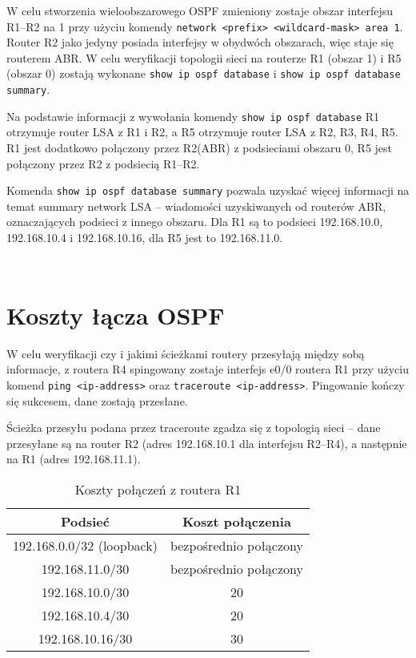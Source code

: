 \documentclass[a4paper,12pt,notitlepage]{article}
\begin{document}
W celu stworzenia wieloobszarowego OSPF zmieniony zostaje obszar interfejsu R1--R2 na 1 przy użyciu komendy \texttt{network <prefix> <wildcard-mask> area 1}. Router R2 jako jedyny posiada interfejsy w obydwóch obszarach, więc staje się routerem ABR. W celu weryfikacji topologii sieci na routerze R1 (obszar 1) i R5 (obszar 0) zostają wykonane \texttt{show ip ospf database} i \texttt{show ip ospf database summary}.

Na podstawie informacji z wywołania komendy \texttt{show ip ospf database} R1 otrzymuje router LSA z R1 i R2, a R5 otrzymuje router LSA z R2, R3, R4, R5. R1 jest dodatkowo połączony przez R2(ABR) z podsieciami obszaru 0, R5 jest połączony przez R2 z podsiecią R1--R2.

Komenda \texttt{show ip ospf database summary} pozwala uzyskać więcej informacji na temat summary network LSA -- wiadomości uzyskiwanych od routerów ABR, oznaczających podsieci z innego obszaru. Dla R1 są to podsieci 192.168.10.0, 192.168.10.4 i 192.168.10.16, dla R5 jest to 192.168.11.0.
\inputminted[label=Router R1, firstline=309, lastline=390]{text}{R1.txt}
\inputminted[label=Router R5, firstline=638, lastline=680]{text}{R5.txt}

\section{Koszty łącza OSPF}

W celu weryfikacji czy i jakimi ścieżkami routery przesyłają między sobą informacje, z routera R4 spingowany zostaje interfejs e0/0 routera R1 przy użyciu komend \texttt{ping <ip-address>} oraz \texttt{traceroute <ip-address>}. Pingowanie kończy się sukcesem, dane zostają przesłane.

Ścieżka przesyłu podana przez traceroute zgadza się z topologią sieci -- dane przesyłane są na router R2 (adres 192.168.10.1 dla interfejsu R2--R4), a następnie na R1 (adres 192.168.11.1).

\begin{table}[H]
    \caption{Koszty połączeń z routera R1}
    \label{tab:R1cost}
    \centering
    \begin{tabular}{*2c}
        \hline\hline
            \textbf{Podsieć} & \textbf{Koszt połączenia} \\
        \hline
            192.168.0.0/32 (loopback) & bezpośrednio połączony \\
            192.168.11.0/30 & bezpośrednio połączony \\
            192.168.10.0/30 & 20 \\
            192.168.10.4/30 & 20 \\
            192.168.10.16/30 & 30 \\
        \hline\hline
    \end{tabular}
\end{table}
\end{document}
